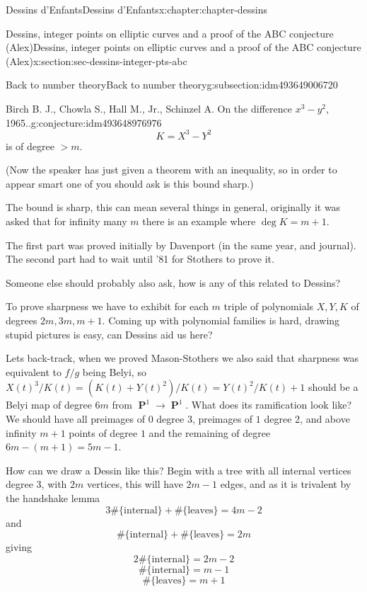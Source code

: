\documentclass[oneside,10pt,]{book}
\numberwithin{equation}{section}
\DeclareMathOperator{\PP}{\mathbf{P}}
\newcommand{\gt}{>}
\begin{document}
\begin{chapterptx}{Dessins d'Enfants}{}{Dessins d'Enfants}{}{}{x:chapter:chapter-dessins}
\begin{sectionptx}{Dessins, integer points on elliptic curves and a proof of the ABC conjecture (Alex)}{}{Dessins, integer points on elliptic curves and a proof of the ABC conjecture (Alex)}{}{}{x:section:sec-dessins-integer-pts-abc}
\begin{subsectionptx}{Back to number theory}{}{Back to number theory}{}{}{g:subsection:idm493649006720}
\begin{conjecture}{Birch B. J., Chowla S., Hall M., Jr., Schinzel A. On the difference \(x^3 - y^2\), 1965..}{}{g:conjecture:idm493648976976}
\begin{equation*}
K = X^3 - Y^2
\end{equation*}
is of degree \(\gt m\).%
\par
(Now the speaker has just given a theorem with an inequality, so in order to appear smart one of you should ask is this bound sharp.)%
\par
The bound is sharp, this can mean several things in general, originally it was asked that for infinity many \(m\) there is an example where \(\deg K = m + 1\).%
\end{conjecture}
The first part was proved initially by Davenport (in the same year, and journal). The second part had to wait until '81 for Stothers to prove it.%
\par
Someone else should probably also ask, how is any of this related to Dessins?%
\par
To prove sharpness we have to exhibit for each \(m\) triple of polynomials \(X,Y,K\) of degrees \(2m,3m,m+1\). Coming up with polynomial families is hard, drawing stupid pictures is easy, can Dessins aid us here?%
\par
Lets back-track, when we proved Mason-Stothers we also said that sharpness was equivalent to \(f/g\) being Belyi, so \(X(t)^3/K(t) = (K(t) + Y(t)^2) / K(t) = Y(t)^2/K(t) + 1\) should be a Belyi map of degree \(6m\) from \(\PP^1\to \PP^1\). What does its ramification look like? We should have all preimages of \(0\) degree 3, preimages of \(1\) degree 2, and above infinity \(m + 1\) points of degree \(1\) and the remaining of degree \(6m - (m + 1) = 5m - 1\).%
\par
How can we draw a Dessin like this? Begin with a tree with all internal vertices degree 3, with \(2m\) vertices, this will have \(2m - 1\) edges, and as it is trivalent by the handshake lemma%
\begin{equation*}
3 \#\{\text{internal}\} + \#\{\text{leaves}\} =  4m - 2
\end{equation*}
and%
\begin{equation*}
\#\{\text{internal}\} + \#\{\text{leaves}\} =  2m
\end{equation*}
giving%
\begin{equation*}
2\#\{\text{internal}\} =  2m - 2
\end{equation*}
%
\begin{equation*}
\#\{\text{internal}\} =  m - 1
\end{equation*}
%
\begin{equation*}
\#\{\text{leaves}\} =  m + 1

\end{equation*}
\end{subsectionptx}
\end{sectionptx}
\end{chapterptx}
\end{document}
